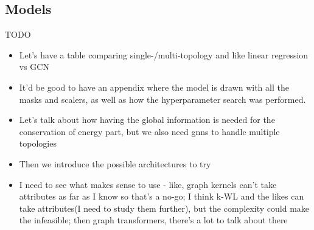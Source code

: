 \subsection*{Models}
TODO
\begin{itemize}
    \item Let's have a table comparing single-/multi-topology and like linear regression vs GCN
    \item It'd be good to have an appendix where the model is drawn with all the masks and scalers,
    as well as how the hyperparameter search was performed.
    \item Let's talk about how having the global information is needed for the conservation of energy
    part, but we also need gnns to handle multiple topologies
    \item Then we introduce the possible architectures to try
    \item I need to see what makes sense to use - like, graph kernels can't take attributes as far as I
    know so that's a no-go; I think k-WL and the likes can take attributes(I need to study them further),
    but the complexity could make the infeasible; then graph transformers, there's a lot to talk about there
\end{itemize}